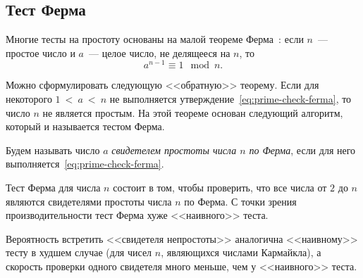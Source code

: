 \subsection{Тест Ферма}\label{section-prime-check-ferma}

Многие тесты на простоту основаны на малой теореме Ферма~\cite{Vinberg:2008}: если $n$~--- простое число и $a$~--- целое число, не делящееся на $n$, то
\begin{equation}\label{eq:prime-check-ferma}
    a^{n-1} \equiv 1 \mod n.
\end{equation}

Можно сформулировать следующую <<обратную>> теорему. Если для некоторого $1~<~a~<~n$ не выполняется утверждение~\ref{eq:prime-check-ferma}, то число $n$ не является простым. На этой теореме основан следующий алгоритм, который и называется тестом Ферма.

Будем называть число $a$ \emph{свидетелем простоты числа $n$ по Ферма}, если для него выполняется~\ref{eq:prime-check-ferma}.

Тест Ферма для числа $n$ состоит в том, чтобы проверить, что все числа от $2$ до $n$ являются свидетелями простоты числа $n$ по Ферма. С точки зрения производительности тест Ферма хуже <<наивного>> теста.

Вероятность встретить <<свидетеля непростоты>> аналогична <<наивному>> тесту в худшем случае (для чисел $n$, являющихся числами Кармайкла), а скорость проверки одного свидетеля много меньше, чем у <<наивного>> теста.
